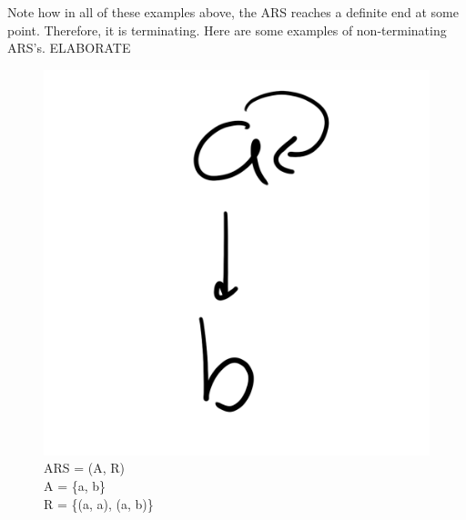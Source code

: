 \documentclass{article}
\begin{document}
{\medskip\noindent
Note how in all of these examples above, the ARS reaches a definite end at some point. Therefore, it is terminating. Here are some examples of non-terminating ARS's. ELABORATE

\begin{figure}[h!]
  \centering
  \includegraphics[scale=0.06]{gen6}
  \caption[] {
     ARS = (A, R) \\ A = \{a, b\} \\ R = \{(a, a), (a, b)\}
    \endtabular}
\end{figure}

}
\end{document}
